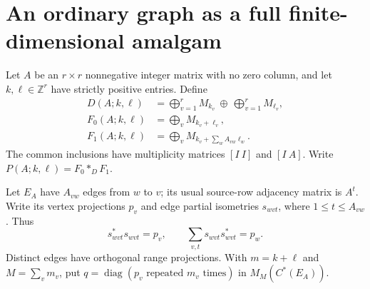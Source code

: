 \documentclass[11pt,letterpaper]{amsart}
\theoremstyle{remark}\newtheorem{remark}[theorem]{Remark}
\newcommand{\Z}{\mathbb Z}\newcommand{\C}{\mathbb C}
\begin{document}
\section{An ordinary graph as a full finite-dimensional amalgam}
Let $A$ be an $r\times r$ nonnegative integer matrix with no zero column,
and let $k,\ell\in\Z^r$ have strictly positive entries. Define
\begin{align*}
 D(A;k,\ell)&=\bigoplus_{v=1}^rM_{k_v}\ \oplus\ \bigoplus_{v=1}^rM_{\ell_v},\\
 F_0(A;k,\ell)&=\bigoplus_vM_{k_v+\ell_v},\\
 F_1(A;k,\ell)&=\bigoplus_vM_{k_v+\sum_w A_{vw}\ell_w}.
\end{align*}
The common inclusions have multiplicity matrices $[I\ I]$ and $[I\ A]$.
Write $P(A;k,\ell)=F_0*_{D}F_1$.

Let $E_A$ have $A_{vw}$ edges from $w$ to $v$; its usual source-row
adjacency matrix is $A^t$. Write its vertex projections $p_v$ and edge
partial isometries $s_{wvt}$, where $1\le t\le A_{vw}$. Thus
\[
 s_{wvt}^*s_{wvt}=p_v,\qquad
 \sum_{v,t}s_{wvt}s_{wvt}^*=p_w.
\]
Distinct edges have orthogonal range projections. With $m=k+\ell$ and
$M=\sum_vm_v$, put $q=\operatorname{diag}(p_v\text{ repeated }m_v\text{ times})$
in $M_M(C^*(E_A))$.
\end{document}
